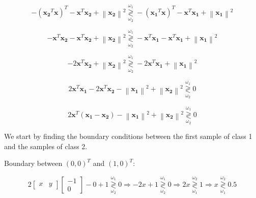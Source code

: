 \documentclass[fleqn]{article}
\newcommand{\norm}[1]{\left \lVert #1 \right \rVert}
\begin{document}
\begin{enumerate}
		\begin{equation*}
			- (\mathbf{x_2}^T\mathbf{x})^T - \mathbf{x}^T\mathbf{x_2} + \norm{\mathbf{x_2}}^2 \overset{\omega_1}{\underset{\omega_2}{\gtrless}} - (\mathbf{x_1}^T\mathbf{x})^T - \mathbf{x}^T\mathbf{x_1} + \norm{\mathbf{x_1}}^2
		\end{equation*}
		
		\begin{equation*}
			- \mathbf{x}^T\mathbf{x_2} - \mathbf{x}^T\mathbf{x_2} + \norm{\mathbf{x_2}}^2 \overset{\omega_1}{\underset{\omega_2}{\gtrless}} - \mathbf{x}^T\mathbf{x_1} - \mathbf{x}^T\mathbf{x_1} + \norm{\mathbf{x_1}}^2
		\end{equation*}
		
		\begin{equation*}
			- 2\mathbf{x}^T\mathbf{x_2} + \norm{\mathbf{x_2}}^2 \overset{\omega_1}{\underset{\omega_2}{\gtrless}} - 2\mathbf{x}^T\mathbf{x_1} + \norm{\mathbf{x_1}}^2
		\end{equation*}
		
		\begin{equation*}
			2\mathbf{x}^T\mathbf{x_1} - 2\mathbf{x}^T\mathbf{x_2} - \norm{\mathbf{x_1}}^2 + \norm{\mathbf{x_2}}^2 \overset{\omega_1}{\underset{\omega_2}{\gtrless}} 0
		\end{equation*}
		
		\begin{equation*}
			2\mathbf{x}^T(\mathbf{x_1} - \mathbf{x_2}) - \norm{\mathbf{x_1}}^2 + \norm{\mathbf{x_2}}^2 \overset{\omega_1}{\underset{\omega_2}{\gtrless}} 0
		\end{equation*}
		
		We start by finding the boundary conditions between the first sample of class 1 and the samples of class 2.
		
		Boundary between $(0,0)^T$ and $(1,0)^T$:
		
		\begin{equation*}
			2 \begin{bmatrix} x & y \end{bmatrix} \begin{bmatrix}-1\\ 0\end{bmatrix} - 0 + 1 \overset{\omega_1}{\underset{\omega_2}{\gtrless}} 0 \Rightarrow -2x + 1 \overset{\omega_1}{\underset{\omega_2}{\gtrless}} 0 \Rightarrow 2x \overset{\omega_2}{\underset{\omega_1}{\gtrless}} 1 \Rightarrow x \overset{\omega_2}{\underset{\omega_1}{\gtrless}} 0.5			
		\end{equation*}
		

\end{enumerate}
\end{document}
